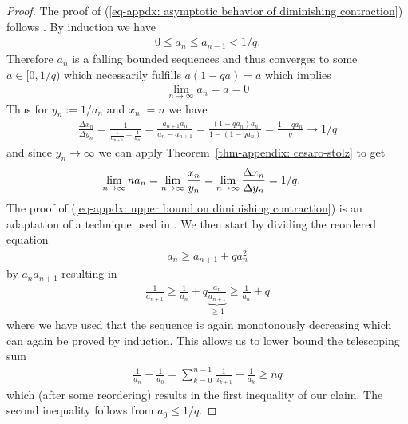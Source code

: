 \begin{proof}
	The proof of (\ref{eq-appdx: asymptotic behavior of diminishing contraction})
	follows \textcite{israelHowWorkOut2012}.
	By induction we have
	\begin{align*}
		0\le a_n \le a_{n-1} < 1/q.
	\end{align*}
	Therefore \(a_n\) is a falling bounded sequences and thus converges to
	some \(a\in[0,1/q)\) which necessarily fulfills
		\(a(1-qa) = a\)
	which implies
	\begin{align*}
		\lim_{n\to\infty} a_n = a = 0
	\end{align*}
	Thus for \(y_n := 1/a_n\) and \(x_n:=n\) we have
	\begin{align*}
		\frac{\Delta x_n}{\Delta y_n}
		= \frac{1}{\frac{1}{a_{n+1}}-\frac1{a_n}}
		= \frac{a_{n+1}a_n}{a_n - a_{n+1}}
		= \frac{(1-q a_n)a_n}{1 - (1-q a_n)}
		= \frac{1-q a_n}{q} \to 1/q
	\end{align*}
	and since \(y_n\to\infty\) we can apply Theorem~\ref{thm-appendix: cesaro-stolz}
	to get
	\begin{align*}
		\lim_{n\to\infty} n a_n
		&= \lim_{n\to\infty} \frac{x_n}{y_n}
		= \lim_{n\to\infty} \frac{\Delta x_n}{\Delta y_n}
		= 1/q.
		\qedhere
	\end{align*}
	The proof of (\ref{eq-appdx: upper bound on diminishing contraction}) is an
	adaptation of a technique used in \textcite[Theorem
	2.1.14]{nesterovLecturesConvexOptimization2018}. We then start by
	dividing the reordered equation
	\begin{align*}
		a_n \ge a_{n+1} + qa_n^2
	\end{align*}
	by \(a_na_{n+1}\) resulting in
	\begin{align*}
		\frac1{a_{n+1}}
		\ge \frac1{a_n} + q \underbrace{\frac{a_n}{a_{n+1}}}_{\ge 1}
		\ge \frac1{a_n} + q
	\end{align*}
	where we have used that the sequence is again monotonously decreasing
	which can again be proved by induction.
	This allows us to lower bound the telescoping sum
	\begin{align*}
		\frac1{a_n} - \frac1{a_0}
		= \sum_{k=0}^{n-1} \frac1{a_{k+1}} - \frac1{a_k}
		\ge nq
	\end{align*}
	which (after some reordering) results in the first inequality of our claim.
	The second inequality follows from \(a_0 \le 1/q\).
\end{proof}

